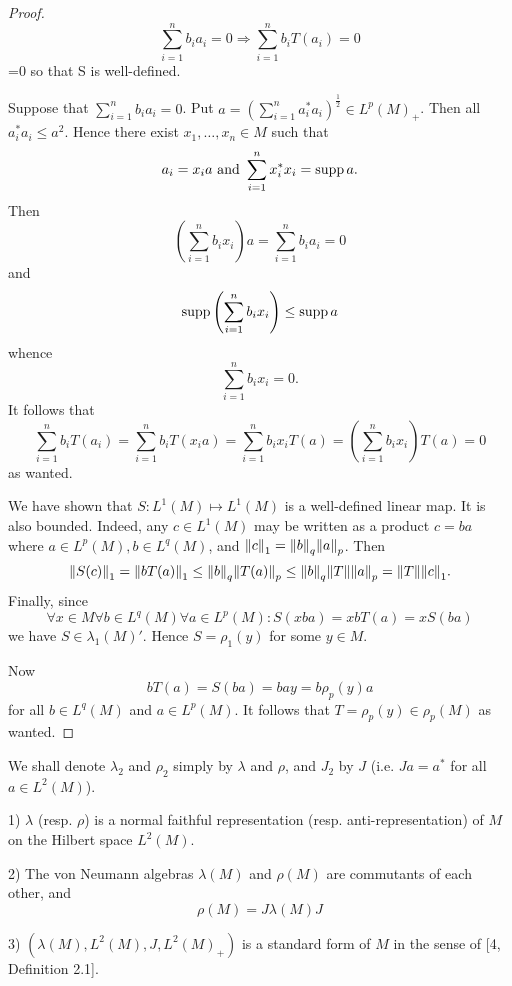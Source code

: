 \begin{proof}
    \begin{equation}
        \sum_{i=1}^nb_ia_i=0\Rightarrow \sum_{i=1}^nb_iT(a_i)=0
    \end{equation}
    {\color{red} =0} so that S is well-defined.\par
    Suppose that $\sum_{i=1}^nb_ia_i=0$. Put $a=\left( \sum_{i=1}^na_i^*a_i \right)^\frac{1}{2} \in L^p(M)_+$. Then all $a_i^*a_i\leq a^2$. Hence there exist $x_1,\dots,x_n\in M$ such that
    \[
        a_i=x_ia \text{ and }\sum_{i=1}^n x_i^*x_i=\operatorname{supp} a.
    \]
    Then
    \[
        \left( \sum_{i=1}^nb_ix_i \right)a= \sum_{i=1}^nb_ia_i =0
    \]
    and
    \[
        \operatorname{supp}\left( \sum_{i=1}^nb_ix_i \right) \leq \operatorname{supp} a
    \]
    whence
    \[
        \sum_{i=1}^nb_ix_i=0.
    \]
    It follows that
    \[
        \sum_{i=1}^nb_iT(a_i)=\sum_{i=1}^nb_iT(x_ia)=\sum_{i=1}^nb_ix_iT(a)=\left( \sum_{i=1}^nb_ix_i \right)T(a)=0
    \]
    as wanted.\par
    We have shown that $S:L^1(M) \mapsto L^1(M)$ is a well-defined linear map. It is also bounded. Indeed, any $c\in L^1(M)$ may be written as a product $c = ba$ where $a\in L^p(M),  b\in  L^q(M)$, and $\norm{c}_1=\norm{b}_q\norm{a}_p$. Then
    \[
        \norm{S(c)}_1=\norm{bT(a)}_1\leq \norm{b}_q\norm{T(a)}_p\leq\norm{b}_q\norm{T}\norm{a}_p=\norm{T}\norm{c}_1.
    \]
    Finally, since
    \[
        \forall x\in M \forall b\in  L^q(M) \forall a\in L^p(M): S(xba) = xb T(a) = x S(ba)
    \]
    we have $S\in \lambda_1(M)'$. Hence $S=\rho_1(y)$ for some $y\in M$.\par
    Now
    \[
        b T(a)=S(ba) =bay= b \rho_p(y)a
    \]
    for all $b\in L^q(M)$ and $a\in L^p(M)$. It follows that $T=\rho_p(y)\in \rho_p(M)$ as wanted.
\end{proof}
We shall denote $\lambda_2$ and $\rho_2$ simply by $\lambda$ and $\rho$, and $J_2$ by $J$ (i.e. $Ja=a^*$ for all $a\in L^2(M)$).
\begin{theorem}
    1) $\lambda$ (resp. $\rho$) is a normal faithful representation (resp. anti-representation) of $M$ on the Hilbert space $L^2(M)$.\par
    2) The von Neumann algebras $\lambda(M)$ and $\rho(M)$ are commutants of each other, and
    \[
        \rho(M)=J\lambda(M)J
    \]\par
    3) $(\lambda(M),L^2(M),J,L^2(M)_+)$ is a standard form of $M$ in the sense of [4, Definition 2.1].
\end{theorem}
